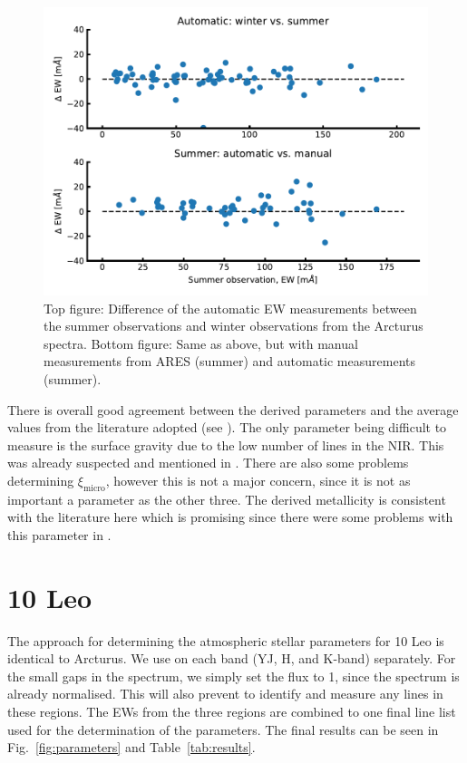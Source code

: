 \begin{figure}[htpb!]
    \centering
    \includegraphics[width=1.0\linewidth]{figures/EWcomp.pdf}
    \caption{Top figure: Difference of the automatic EW measurements between the
             summer observations and winter observations from the Arcturus
             spectra. Bottom figure: Same as above, but with manual measurements
             from ARES (summer) and automatic measurements (summer).}
    \label{fig:EWcomp}
\end{figure}

There is overall good agreement between the derived parameters and the average values from the
literature adopted (see ). The only parameter being difficult to measure is the
surface gravity due to the low number of  lines in the NIR. This was already suspected
and mentioned in . There are also some problems determining
$\xi_\mathrm{micro}$, however this is not a major concern, since it is not as important a parameter
as the other three. The derived metallicity is consistent with the literature here which is promising
since there were some problems with this parameter in .


\section{10 Leo}
\label{sec:10Leo}

The approach for determining the atmospheric stellar parameters for 10 Leo is identical to Arcturus.
We use \ARES on each band (YJ, H, and K-band) separately. For the small gaps in the spectrum, we
simply set the flux to 1, since the spectrum is already normalised. This will also prevent \ARES to
identify and measure any lines in these regions. The EWs from the three regions are combined to one
final line list used for the determination of the parameters. The final results can be seen in
Fig.~\ref{fig:parameters} and Table~\ref{tab:results}.

